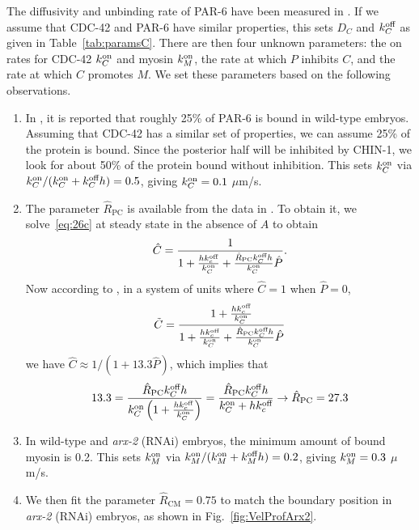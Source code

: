 \documentclass[11pt]{article}
\newcommand{\6}[1]{#1_{\text{6}}}
\newcommand{\3}[1]{#1_{\text{3}}}
\begin{document}
The diffusivity and unbinding rate of PAR-6 have been measured in \cite{robin2014single}. If we assume that CDC-42 and PAR-6 have similar properties, this sets $D_C$ and $k^\text{off}_C$ as given in Table\ \ref{tab:paramsC}. There are then four unknown parameters: the on rates for CDC-42 $k^\text{on}_C$ and myosin $k^\text{on}_M$, the rate at which $P$ inhibits $C$, and the rate at which $C$ promotes $M$. We set these parameters based on the following observations. 
\begin{enumerate}
\item In \cite[Fig.~S3i]{gross2019guiding}, it is reported that roughly 25\% of PAR-6 is bound in wild-type embryos. Assuming that CDC-42 has a similar set of properties, we can assume 25\% of the protein is bound. Since the posterior half will be inhibited by CHIN-1, we look for about 50\% of the protein bound without inhibition. This sets $k^\text{on}_C$ via $k^\text{on}_C/(k^\text{on}_C+k^\text{off}_C h)=0.5$, giving $k^\text{on}_C=0.1$ $\mu$m/s. 
\item The parameter $\hat{R}_\text{PC}$ is available from the data in \cite{sailer2015dynamic}. To obtain it, we solve\ \eqref{eq:26c} at steady state in the absence of $A$ to obtain
\begin{equation}
\hat C = \frac{1}{1+\frac{h k^\text{off}_c}{k^\text{on}_C}+\frac{\hat R_\text{PC}k^\text{off}_C h}{k^\text{on}_C} \hat P}. 
\end{equation}
Now according to \cite{sailer2015dynamic}, in a system of units where $\hat C=1$ when $\hat P=0$,
\begin{equation*}
\tilde C =   \frac{1+\frac{h k^\text{off}_c}{k^\text{on}_C}}{1+\frac{h k^\text{off}_c}{k^\text{on}_C}+\frac{\hat R_\text{PC}k^\text{off}_C h}{k^\text{on}_C} \hat P}
\end{equation*} 
we have $\hat{C} \approx 1/(1+13.3\hat{P})$, which implies that 
\begin{equation*}
13.3 = \frac{\hat R_\text{PC}k^\text{off}_C h}{k^\text{on}_C\left(1+\frac{h k^\text{off}_c}{k^\text{on}_C}\right)}= \frac{\hat R_\text{PC}k^\text{off}_C h}{k^\text{on}_C+h k^\text{off}_c} \rightarrow \hat R_\text{PC}=27.3
\end{equation*}
\item In wild-type and \emph{arx-2} (RNAi) embryos, the minimum amount of bound myosin is 0.2. This sets $k^\text{on}_M$ via $k^\text{on}_M/(k^\text{on}_M+k^\text{off}_M h)=0.2$, giving $k^\text{on}_M=0.3$ $\mu$m/s.
\item We then fit the parameter $\hat R_\text{CM}=0.75$ to match the boundary position in \emph{arx-2} (RNAi) embryos, as shown in Fig.\ \ref{fig:VelProfArx2}.
\end{enumerate}
\end{document}
